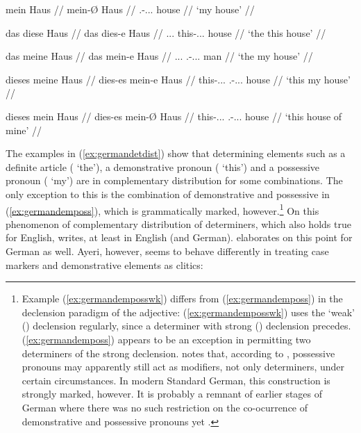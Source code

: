 	\a\begingl
		\gla mein Haus //
		\glb mein-Ø Haus //
		\glc \Fsg{}.\Gen{}-\Nom{}.\Sg{}.\N{}.\St{} house //
		\glft `my house' //
	\endgl

	\a\ljudge*\begingl
		\gla das diese Haus //
		\glb das dies-e Haus //
		\glc \Def{}.\Nom{}.\Sg{}.\N{} this-\Nom{}.\Sg{}.\N{}.\Wk{} house //
		\glft `the this house' //
	\endgl

	\a\ljudge*\begingl
		\gla das meine Haus //
		\glb das mein-e Haus //
		\glc \Def{}.\Nom{}.\Sg{}.\N{} \Fsg{}.\Gen{}-\Nom{}.\Sg{}.\N{}.\Wk{} 
			man //
		\glft `the my house' //
	\endgl

	\a\ljudge*\label{ex:germandemposswk}\begingl
		\gla dieses meine Haus //
		\glb dies-es mein-e Haus //
		\glc this-\Nom{}.\Sg{}.\N{}.\St{} 
			\Fsg{}.\Gen{}-\Nom{}.\Sg{}.\N{}.\Wk{} house //
		\glft `this my house' //
	\endgl

	\a\ljudge\hash\label{ex:germandemposs}\begingl
		\gla dieses mein Haus //
		\glb dies-es mein-Ø Haus //
		\glc this-\Nom{}.\Sg{}.\N{}.\St{} 
			\Fsg{}.\Gen{}-\Nom{}.\Sg{}.\N{}.\St{} house //
		\glft `this house of mine' //
	\endgl
\xe

The examples in (\ref{ex:germandetdist}) show that determining elements such as
a definite article ( `the'), a demonstrative pronoun (
`this') and a possessive pronoun ( `my') are in complementary
distribution for some combinations. The only exception to this is the
combination of demonstrative and possessive in (\ref{ex:germandemposs}), which
is grammatically marked, however.\footnote{Example (\ref{ex:germandemposswk})
differs from (\ref{ex:germandemposs}) in the declension paradigm of the
adjective: (\ref{ex:germandemposswk}) uses the `weak' (\Wk) declension
regularly, since a determiner with strong (\St) declension precedes.
(\ref{ex:germandemposs}) appears to be an exception in permitting two
determiners of the strong declension. \citet[160--161, 203--205]{demske2001}
notes that, according to \citet{plank1992}, possessive pronouns may apparently
still act as modifiers, not only determiners, under certain circumstances. In
modern Standard German, this construction is strongly marked, however. It is
probably a remnant of earlier stages of German where there was no such
restriction on the co-ocurrence of demonstrative and possessive pronouns yet
\citep[173]{demske2001}.} On this phenomenon of complementary distribution of
determiners, which also holds true for English, \citet[208]{carnie2013} writes,
 at least in English
(and German). \citet[9--22]{demske2001} elaborates on this point for German as
well. Ayeri, however, seems to behave differently in treating case markers and
demonstrative elements as clitics:

